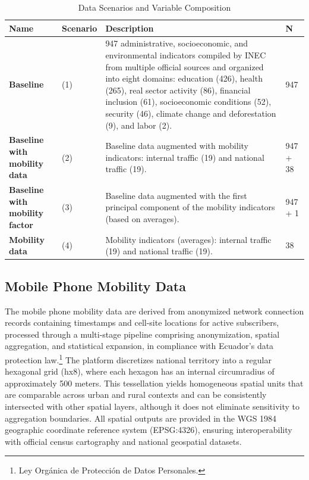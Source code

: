 \documentclass[pdflatex,sn-apa]{sn-jnl}
\begin{document}
\begin{table}[!htbp]
\centering
\begin{tabular}{p{3.5cm} p{2.5cm} p{7cm} p{1.5cm}}
\toprule
\textbf{Name} & \textbf{Scenario} & \textbf{Description} & \textbf{N} \\
\midrule

\textbf{Baseline}
& (1)
& 947 administrative, socioeconomic, and environmental indicators compiled by INEC from multiple official sources and organized into eight domains: education (426), health (265), real sector activity (86), financial inclusion (61), socioeconomic conditions (52), security (46), climate change and deforestation (9), and labor (2).
& 947 \\

\midrule

\textbf{Baseline with \newline mobility data}
& (2)
& Baseline data augmented with mobility indicators:
internal traffic (19) and national traffic (19).
& 947 + 38 \\

\midrule

\textbf{Baseline with \newline mobility factor}
& (3)
& Baseline data augmented with the first principal component of the mobility indicators (based on averages).
& 947 + 1 \\

\midrule

\textbf{Mobility data}
& (4)
& Mobility indicators (averages): internal traffic (19) and national traffic (19).
& 38 \\

\bottomrule
\end{tabular}
\caption{Data Scenarios and Variable Composition}
\label{tab:data}
\end{table}

\subsection{Mobile Phone Mobility Data}

The mobile phone mobility data are derived from anonymized network connection records containing timestamps and cell-site locations for active subscribers, processed through a multi-stage pipeline comprising anonymization, spatial aggregation, and statistical expansion, in compliance with Ecuador's data protection law.\footnote{Ley Org\'{a}nica de Protecci\'{o}n de Datos Personales.} The platform discretizes national territory into a regular hexagonal grid (hx8), where each hexagon has an internal circumradius of approximately 500 meters. This tessellation yields homogeneous spatial units that are comparable across urban and rural contexts and can be consistently intersected with other spatial layers, although it does not eliminate sensitivity to aggregation boundaries. All spatial outputs are provided in the WGS 1984 geographic coordinate reference system (EPSG:4326), ensuring interoperability with official census cartography and national geospatial datasets.
\end{document}
